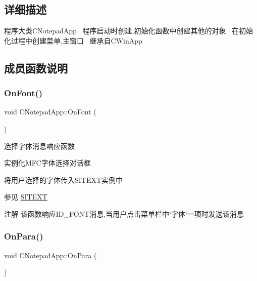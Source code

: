 \subsection{详细描述}
程序大类\+C\+Notepad\+App~\newline
程序启动时创建,初始化函数中创建其他的对象~\newline
在初始化过程中创建菜单,主窗口~\newline
继承自\+C\+Win\+App 

\subsection{成员函数说明}
\mbox{\label{class_c_notepad_app_aa09334de95a65c56cdca8a682b006bb6}} 
\subsubsection{\texorpdfstring{On\+Font()}{OnFont()}}
{\footnotesize\ttfamily void C\+Notepad\+App\+::\+On\+Font (\begin{DoxyParamCaption}{ }\end{DoxyParamCaption})}



选择字体消息响应函数~\newline



\begin{DoxyItemize}
\item 实例化\+M\+F\+C字体选择对话框
\item 将用户选择的字体传入\+S\+I\+T\+E\+X\+T实例中 \begin{DoxySeeAlso}{参见}
\hyperlink{class_s_i_t_e_x_t}{S\+I\+T\+E\+XT} 
\end{DoxySeeAlso}
\begin{DoxyNote}{注解}
该函数响应\+I\+D\+\_\+\+F\+O\+N\+T消息,当用户点击菜单栏中\char`\"{}字体\char`\"{}一项时发送该消息 
\end{DoxyNote}

\end{DoxyItemize}\mbox{\label{class_c_notepad_app_a954649ecbb87fb8a001f2ed399440261}} 
\subsubsection{\texorpdfstring{On\+Para()}{OnPara()}}
{\footnotesize\ttfamily void C\+Notepad\+App\+::\+On\+Para (\begin{DoxyParamCaption}{ }\end{DoxyParamCaption})}



